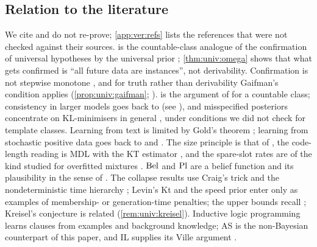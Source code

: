 \subsection{Relation to the literature}\label{sec:disc:lit}

We cite and do not re-prove; \cref{app:ver:refs} lists the references that were not checked against their sources.  is the countable-class analogue of the confirmation of universal hypotheses by the universal prior \citep{hutter2007universal}; \cref{thm:univ:omega} shows that what gets confirmed is ``all future data are instances'', not derivability. Confirmation is not stepwise monotone \citep{leike2015solomonoff}, and for truth rather than derivability Gaifman's condition applies (\cref{prop:univ:gaifman}; \citealp{gaifman1964concerning}).  is the argument of \citet{doob1949application} for a countable class; consistency in larger models goes back to \citet{schwartz1965bayes} (see \citealp{ghosal2017fundamentals}), and misspecified posteriors concentrate on KL-minimisers in general \citep{berk1966limiting,kleijn2006misspecification}, under conditions we did not check for template classes. Learning from text is limited by Gold's theorem \citep{gold1967language,angluin1980inductive}; learning from stochastic positive data goes back to \citet{horning1969study} and \citet{angluin1988identifying}. The size principle is that of \citet{tenenbaum2001generalization}, the code-length reading is MDL \citep{rissanen1978modeling} with the KT estimator \citep{krichevsky1981performance}, and the spare-slot rates are of the kind studied for overfitted mixtures \citep{rousseau2011asymptotic}. $\mathrm{Bel}$ and $\mathrm{Pl}$ are a belief function and its plausibility in the sense of \citet{shafer1976mathematical}. The collapse results use Craig's trick \citep{craig1953axiomatizability} and the nondeterministic time hierarchy \citep{cook1972hierarchy,seiferas1978separating,zak1983turing}; Levin's Kt and the speed prior enter only as examples of membership- or generation-time penalties; the upper bounds recall \citet{pudlak1998lengths}; Kreisel's conjecture is related (\cref{rem:univ:kreisel}). Inductive logic programming \citep{muggleton1991inductive} learns clauses from examples and background knowledge; AS is the non-Bayesian counterpart of this paper, and IL supplies its Ville argument \citep{claude2026whatfollows,ville1939etude}.

